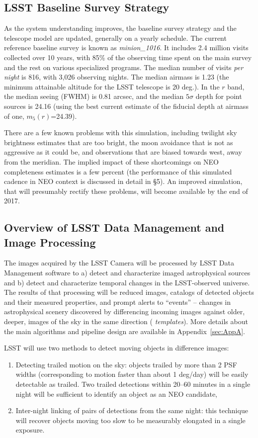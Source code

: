 \subsection{LSST Baseline Survey Strategy}

As the system understanding improves, the baseline survey strategy and the telescope model
are updated, generally on a yearly schedule. The current
reference baseline survey is known as {\it minion\_1016}. It includes 2.4
million visits collected over 10 years, with 85\% of the observing time spent on the
main survey and the rest on various specialized programs. The median number of visits
{\it per night} is 816, with 3,026 observing nights. The median airmass is 1.23 (the
minimum attainable altitude for the LSST telescope is 20 deg.). In the $r$ band, the median
seeing (FWHM) is 0.81 arcsec, and the median $5\sigma$ depth for point sources is 24.16
(using the best current estimate of the fiducial depth at airmass of one, $m_5(r)$=24.39).

There are a few known problems with this simulation, including twilight sky brightness
estimates that are too bright, the moon avoidance that is not as aggressive as it could be,
and observations that are biased towards west, away from the meridian. The implied impact
of these shortcomings on NEO completeness estimates is a few percent (the performance
of this simulated cadence in NEO context is discussed in detail in \S5). An improved simulation,
that will presumably rectify these problems, will become available by the end of 2017.


\subsection{Overview of LSST  Data Management and Image Processing}

The images acquired by the LSST Camera will be processed by LSST Data Management
software \citep{juric15} to a) detect and characterize imaged
astrophysical sources and b) detect and characterize temporal changes
in the LSST-observed universe. The results of that processing will be
reduced images, catalogs of detected objects and their measured properties, and
prompt alerts to ``events'' -- changes in astrophysical scenery discovered by differencing
incoming images against older, deeper, images of the sky in the same direction ({\em
templates}). More details about the main algorithms and pipeline design are available
in Appendix~\ref{sec:AppA}.

LSST will use two methods to detect moving objects in difference images:
\begin{enumerate}
\item Detecting trailed motion on the sky: objects trailed by more
  than 2 PSF widths (corresponding to motion faster than about 1
  deg/day) will be easily detectable as trailed.  Two trailed
  detections within 20--60 minutes in a single night will be
  sufficient to identify an object as an NEO candidate,
\item Inter-night linking of pairs of detections from the same night: this technique will
  recover objects moving too slow to be measurably elongated in a single exposure.
\end{enumerate}

